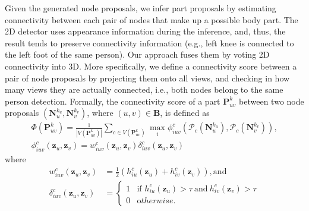 Given the generated node proposals, we infer part proposals by estimating connectivity between each pair of nodes that make up a possible body part. The 2D detector \cite{Wei-2016} uses appearance information during the inference, and, thus, the result tends to preserve connectivity information (e.g., left knee is connected to the left foot of the same person). Our approach fuses them by voting 2D connectivity into 3D. More specifically, we define a connectivity score between a pair of node proposals by projecting them onto all views, and checking in how many views they are actually connected, i.e., both nodes belong to the same person detection. Formally, the connectivity score of a part $\mathbf{P}_{uv}^k$ between two node proposals $( \mathbf{N}_{u}^{k_u}, \mathbf{N}_{v}^{k_v})$, where $(u,v) \in \mathbf{B}$, is defined as
\begin{gather}
{\Phi}( \mathbf{P}_{uv}^k )=  \frac{1}{ | V( \mathbf{P}_{uv}^k ) | } \sum_{c \in V(\mathbf{P}_{uv}^k)}   \max_{i} \phi_{iuv}^c \left( \mathcal{P}_c(\mathbf{N}^{k_u}_{u}),\mathcal{P}_c(\mathbf{N}^{k_v}_{v}) \right), \nonumber \\
\phi_{iuv}^c(\mathbf{z}_u,\mathbf{z}_v) = w_{iuv}^c(\mathbf{z}_u,\mathbf{z}_v)\delta^c_{iuv} \left(\mathbf{z}_u,\mathbf{z}_v \right) \nonumber
% 
%  
\end{gather}
where
\begin{align}
w_{iuv}^c(\mathbf{z}_u,\mathbf{z}_v) &= \frac{1}{2}\left(h_{iu}^c(\mathbf{z}_u) + h_{iv}^c(\mathbf{z}_v) \right), \text{and} \nonumber\\
\delta^c_{iuv}( \mathbf{z}_u ,\mathbf{z}_v) &=  \begin{cases}
1 & \mathrm{if}\,\, h_{iu}^c( \mathbf{z}_u ) > \tau ~\mathrm{and}~h_{iv}^c( \mathbf{z}_v ) > \tau\\
0 & {\mathrm otherwise}.
\end{cases} \nonumber
\end{align}
